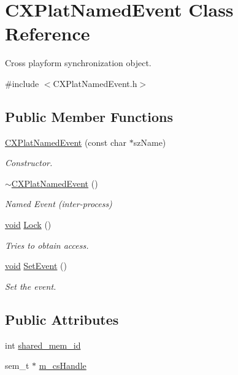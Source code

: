 \hypertarget{class_c_x_plat_named_event}{\section{\-C\-X\-Plat\-Named\-Event \-Class \-Reference}
\label{class_c_x_plat_named_event}
}


\-Cross playform synchronization object.  




{\ttfamily \#include $<$\-C\-X\-Plat\-Named\-Event.\-h$>$}

\subsection*{\-Public \-Member \-Functions}
\begin{DoxyCompactItemize}
\item 
\hyperlink{class_c_x_plat_named_event_a2c23501b98d44972486ec2ab504430d8}{\-C\-X\-Plat\-Named\-Event} (const char $\ast$sz\-Name)
\begin{DoxyCompactList}\small\item\em \-Constructor. \end{DoxyCompactList}\item 
\hyperlink{class_c_x_plat_named_event_a84768b9983ebe19a402d4ec9f0fe0c9a}{$\sim$\-C\-X\-Plat\-Named\-Event} ()
\begin{DoxyCompactList}\small\item\em \-Named \-Event (inter-\/process) \end{DoxyCompactList}\item 
\hyperlink{_cpclient_8h_a6464f7480a0fd0ee170cba12b2c0497f}{void} \hyperlink{class_c_x_plat_named_event_af60495948dd3ef3fcd426e7828c21ff6}{\-Lock} ()
\begin{DoxyCompactList}\small\item\em \-Tries to obtain access. \end{DoxyCompactList}\item 
\hyperlink{_cpclient_8h_a6464f7480a0fd0ee170cba12b2c0497f}{void} \hyperlink{class_c_x_plat_named_event_ac938c52f7e79fc016dbfcbb2106ae8bf}{\-Set\-Event} ()
\begin{DoxyCompactList}\small\item\em \-Set the event. \end{DoxyCompactList}\end{DoxyCompactItemize}
\subsection*{\-Public \-Attributes}
\begin{DoxyCompactItemize}
\item 
int \hyperlink{class_c_x_plat_named_event_afb8505ea92041775d39a44909c214e75}{shared\-\_\-mem\-\_\-id}
\item 
sem\-\_\-t $\ast$ \hyperlink{class_c_x_plat_named_event_a4c544bc92f6ba0c67cce7815a225e838}{m\-\_\-cs\-Handle}
\end{DoxyCompactItemize}
